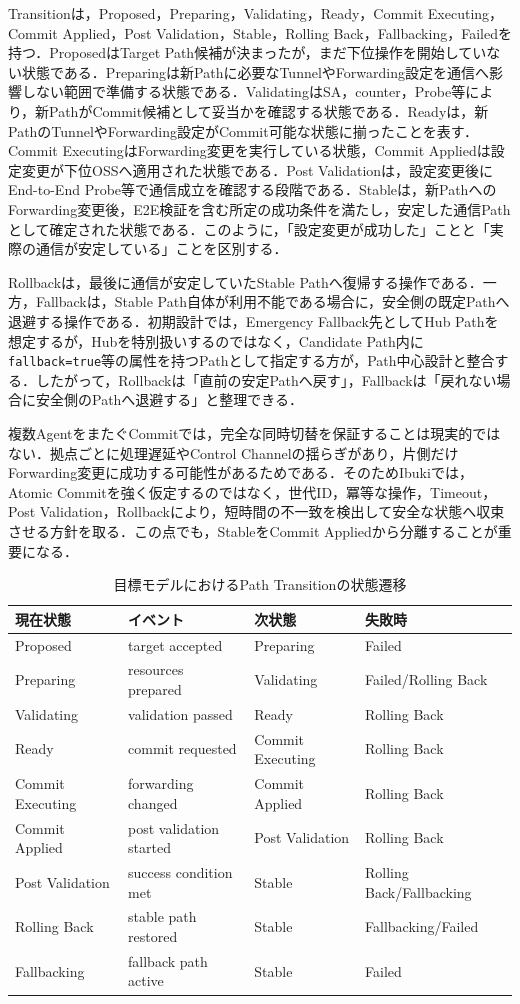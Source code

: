 \documentclass[11pt,a4paper,twoside]{ltjsarticle}
\begin{document}
Transitionは，Proposed，Preparing，Validating，Ready，Commit Executing，Commit Applied，Post Validation，Stable，Rolling Back，Fallbacking，Failedを持つ．ProposedはTarget Path候補が決まったが，まだ下位操作を開始していない状態である．Preparingは新Pathに必要なTunnelやForwarding設定を通信へ影響しない範囲で準備する状態である．ValidatingはSA，counter，Probe等により，新PathがCommit候補として妥当かを確認する状態である．Readyは，新PathのTunnelやForwarding設定がCommit可能な状態に揃ったことを表す．Commit ExecutingはForwarding変更を実行している状態，Commit Appliedは設定変更が下位OSSへ適用された状態である．Post Validationは，設定変更後にEnd-to-End Probe等で通信成立を確認する段階である．Stableは，新PathへのForwarding変更後，E2E検証を含む所定の成功条件を満たし，安定した通信Pathとして確定された状態である．このように，「設定変更が成功した」ことと「実際の通信が安定している」ことを区別する．

Rollbackは，最後に通信が安定していたStable Pathへ復帰する操作である．一方，Fallbackは，Stable Path自体が利用不能である場合に，安全側の既定Pathへ退避する操作である．初期設計では，Emergency Fallback先としてHub Pathを想定するが，Hubを特別扱いするのではなく，Candidate Path内に\texttt{fallback=true}等の属性を持つPathとして指定する方が，Path中心設計と整合する．したがって，Rollbackは「直前の安定Pathへ戻す」，Fallbackは「戻れない場合に安全側のPathへ退避する」と整理できる．

複数AgentをまたぐCommitでは，完全な同時切替を保証することは現実的ではない．拠点ごとに処理遅延やControl Channelの揺らぎがあり，片側だけForwarding変更に成功する可能性があるためである．そのためIbukiでは，Atomic Commitを強く仮定するのではなく，世代ID，冪等な操作，Timeout，Post Validation，Rollbackにより，短時間の不一致を検出して安全な状態へ収束させる方針を取る．この点でも，StableをCommit Appliedから分離することが重要になる．

\begin{table}[h]
\centering
\caption{目標モデルにおけるPath Transitionの状態遷移}
\label{tab:transition-state}
\begin{tabular}{llll}
\toprule
現在状態 & イベント & 次状態 & 失敗時 \\
\midrule
Proposed & target accepted & Preparing & Failed \\
Preparing & resources prepared & Validating & Failed/Rolling Back \\
Validating & validation passed & Ready & Rolling Back \\
Ready & commit requested & Commit Executing & Rolling Back \\
Commit Executing & forwarding changed & Commit Applied & Rolling Back \\
Commit Applied & post validation started & Post Validation & Rolling Back \\
Post Validation & success condition met & Stable & Rolling Back/Fallbacking \\
Rolling Back & stable path restored & Stable & Fallbacking/Failed \\
Fallbacking & fallback path active & Stable & Failed \\
\bottomrule
\end{tabular}
\end{table}
\end{document}
